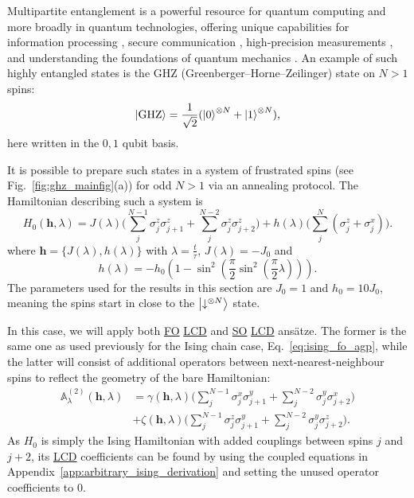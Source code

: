 \documentclass[a4paper,oneside,11pt]{book}
\newcommand{\hbb}{\boldsymbol{h}}
\newcommand{\sx}{\sigma^x}
\newcommand{\sy}{\sigma^y}
\newcommand{\sz}{\sigma^z}
\newcommand{\approxAGP}{\mathbb{A}_{\lambda}}
\newcommand{\acrref}[1]{\hyperref[acr:#1]{#1}}
\begin{document}
Multipartite entanglement is a powerful resource for quantum computing and more broadly in quantum technologies, offering unique capabilities for information processing \cite{nielsen_quantum_2010}, secure communication \cite{bostrom_deterministic_2002}, high-precision measurements \cite{kim_heisenberg-limited_2022}, and understanding the foundations of quantum mechanics \cite{einstein_can_1935}. An example of such highly entangled states is the GHZ (Greenberger–Horne–Zeilinger) state \cite{greenberger_bells_1990} on $N > 1$ spins:
\begin{equation}\label{eq:GHZ_state}
    \ket{\rm GHZ} = \frac{1}{\sqrt{2}} (\ket{0}^{\otimes N} + \ket{1}^{\otimes N}),
\end{equation}
here written in the $0,1$ qubit basis.

It is possible to prepare such states in a system of frustrated spins (see Fig.~\ref{fig:ghz_mainfig}(a)) for odd $N > 1$ via an annealing protocol. The Hamiltonian describing such a system is
\begin{equation}\label{eq:ghz_hamiltonian}
    H_0(\hbb, \lambda) = J(\lambda) \Big( \sum_{j}^{N-1} \sz_j \sz_{j+1} + \sum_{j}^{N-2} \sz_j \sz_{j+2} \Big) + h(\lambda) \Big( \sum_j^N (\sz_j + \sx_j) \Big).
\end{equation}
where $\hbb = \{ J(\lambda), h(\lambda) \}$ with $\lambda = \frac{t}{\tau}$, $J(\lambda)= - J_0$ and
\begin{equation}
    h(\lambda) = - h_0 \left(1 - \sin^2\left(\frac{\pi}{2} \sin^2 \left( \frac{\pi}{2} \lambda \right) \right)\right).
\end{equation}
The parameters used for the results in this section are $J_0 = 1$ and $h_0 = 10J_0$, meaning the spins start in close to the $\ket{\downarrow^{\otimes N}}$ state. 

In this case, we will apply both \acrref{FO} \acrref{LCD} and \acrref{SO} \acrref{LCD} ans\"{a}tze. The former is the same one as used previously for the Ising chain case, Eq.~\eqref{eq:ising_fo_agp}, while the latter will consist of additional operators between next-nearest-neighbour spins to reflect the geometry of the bare Hamiltonian:
\begin{equation}\label{eq:ghz_so_lcd}
    \begin{aligned}
        \approxAGP^{(2)}(\hbb, \lambda) &= \gamma(\hbb, \lambda) \Big( \sum_{j}^{N-1} \sx_j \sy_{j+1} + \sum_{j}^{N-2} \sy_j \sx_{j+2} \Big) \\
        &+ \zeta(\hbb, \lambda) \Big( \sum_{j}^{N-1} \sz_j \sy_{j+1} + \sum_{j}^{N-2} \sy_j \sz_{j+2} \Big).
    \end{aligned}
\end{equation}
As $H_0$ is simply the Ising Hamiltonian with added couplings between spins $j$ and $j+2$, its \acrref{LCD} coefficients can be found by using the coupled equations in Appendix~\ref{app:arbitrary_ising_derivation} and setting the unused operator coefficients to $0$. 
\end{document}
